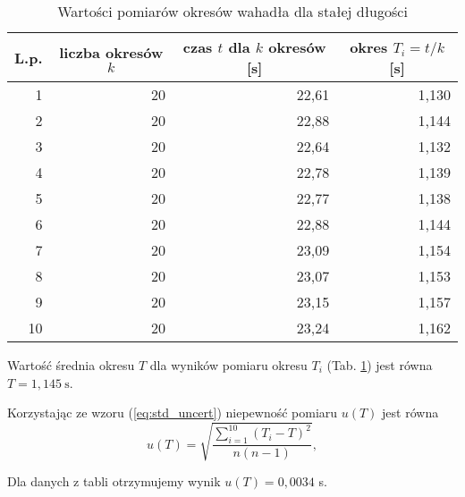 \documentclass[12pt,a4paper]{article}
\numberwithin{equation}{section}
\begin{document}
\begin{table}[!ht]
	\caption{Wartości pomiarów okresów wahadła dla stałej długości}
	\begin{center}
		\begin{tabular}{r|r|r|r}
			\hline
			\multicolumn{1}{c|}{L.p.} & \multicolumn{1}{c|}{liczba okresów $k$} & \multicolumn{1}{c|}{czas $t$ dla $k$ okresów [s]} & \multicolumn{1}{c}{okres $T_i = t/k$ [s]} \\ \hline \hline
			1 & 20 & 22,61 & 1,130 \\
			2 & 20 & 22,88 & 1,144 \\
			3 & 20 & 22,64 & 1,132 \\
			4 & 20 & 22,78 & 1,139 \\
			5 & 20 & 22,77 & 1,138 \\
			6 & 20 & 22,88 & 1,144 \\
			7 & 20 & 23,09 & 1,154 \\
			8 & 20 & 23,07 & 1,153 \\
			9 & 20 & 23,15 & 1,157 \\
			10 & 20 & 23,24 & 1,162 \\ \hline
		\end{tabular}
	\end{center}
	\label{tab:tab1}
\end{table}
Wartość średnia okresu $T$ dla wyników pomiaru okresu $T_i$ (Tab. \ref{tab:tab1}) jest równa $T = 1,145~\textrm{s}$. 

Korzystając ze wzoru (\ref{eq:std_uncert}) niepewność pomiaru $u(T)$ jest równa
\begin{equation}
	u(T) = \sqrt{\frac{\sum_{i=1}^{10}(T_i - T)^2}{n(n-1)}},
\end{equation}

Dla danych z tabli otrzymujemy wynik $u(T) = 0,0034$ s.
\end{document}
